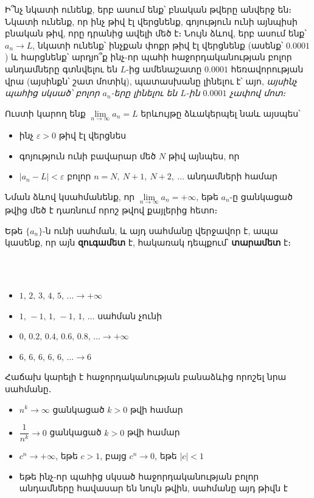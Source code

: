 Ի՞նչ նկատի ունենք, երբ ասում ենք՝ բնական թվերը անվերջ են։ Նկատի ունենք, որ ինչ թիվ էլ վերցնենք, գոյություն ունի այնպիսի բնական թիվ, որը դրանից ավելի մեծ է։ Նույն ձևով, երբ ասում ենք՝ $a_n \to L$, նկատի ունենք՝ ինչքան փոքր թիվ էլ վերցնենք (ասենք՝ $0.0001$) և հարցնենք՝ արդյո՞ք ինչ-որ պահի հաջորդականության բոլոր անդամները գտնվելու են $L$-ից ամենաշատը $0.0001$ հեռավորության վրա (այսինքն՝ շատ մոտիկ), պատասխանը լինելու է՝  այո, \textit{այսինչ պահից սկսած՝ բոլոր $a_n$-երը լինելու են $L$-ին $0.0001$ չափով մոտ։} 

 \label{eps-delta}Ուստի կարող ենք $\lim\limits_{n\to\infty} a_n=L$ երևույթը ձևակերպել նաև այսպես՝
\begin{itemize}
 \item ինչ $\varepsilon>0$ թիվ էլ վերցնես
 \item գոյություն ունի բավարար մեծ $N$ թիվ այնպես, որ 
 \item $|a_n - L|<\varepsilon$ բոլոր $n=N,\ N+1,\ N+2,\ \dots$ անդամների համար
\end{itemize}

Նման ձևով կսահմանենք, որ $\lim\limits_{n\to\infty} a_n=+\infty$, եթե $a_n$-ը ցանկացած թվից մեծ է դառնում որոշ թվով քայլերից հետո։

\begin{definition}
Եթե $\{a_n\}$-ն ունի սահման, և այդ սահմանը վերջավոր է, ապա կասենք, որ այն \textbf{զուգամետ} է, հակառակ դեպքում՝ \textbf{տարամետ} է։
\end{definition}
    

\begin{example}
\\~
\begin{itemize}
    \item $1,\, 2,\, 3,\, 4,\, 5,\, \dots  \to +\infty$ 
    \item $1,\, -1,\, 1,\, -1,\, 1,\, \dots$ սահման չունի
    \item $0,\, 0.2,\, 0.4,\, 0.6,\, 0.8,\, \dots \to +\infty$
    \item $6,\, 6,\, 6,\, 6,\, 6,\,  \dots  \to 6$
\end{itemize}
\end{example}


Հաճախ կարելի է հաջորդականության բանաձևից որոշել նրա սահմանը․
\begin{itemize}
    \item $n^k \to \infty$ ցանկացած $k>0$ թվի համար
    \item $\dfrac{1}{n^k} \to 0$ ցանկացած $k>0$ թվի համար
    \item {}$c^n\to +\infty$, եթե $c>1$, բայց $c^n \to 0$, եթե $|c|<1$
    \item եթե ինչ-որ պահից սկսած հաջորդականության բոլոր անդամները հավասար են նույն թվին, սահմանը այդ թիվն է 
\end{itemize}

